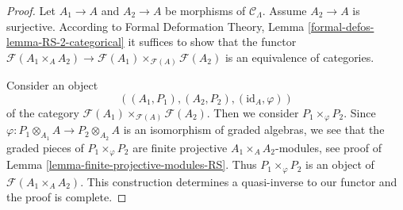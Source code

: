 \documentclass[10pt,a4paper]{amsart}
\theoremstyle{plain}
\theoremstyle{definition}
\theoremstyle{remark}
\numberwithin{equation}{subsection}
\begin{document}
\begin{proof}
Let $A_1 \to A$ and $A_2 \to A$ be morphisms of $\mathcal{C}_\Lambda$.
Assume $A_2 \to A$ is surjective. According to
Formal Deformation Theory, Lemma
\ref{formal-defos-lemma-RS-2-categorical}
it suffices to show that the functor
$\mathcal{F}(A_1 \times_A A_2) \to
\mathcal{F}(A_1) \times_{\mathcal{F}(A)} \mathcal{F}(A_2)$
is an equivalence of categories.

\medskip\noindent
Consider an object
$$
((A_1, P_1), (A_2, P_2), (\text{id}_A, \varphi))
$$
of the category $\mathcal{F}(A_1) \times_{\mathcal{F}(A)} \mathcal{F}(A_2)$.
Then we consider $P_1 \times_\varphi P_2$. Since
$\varphi : P_1 \otimes_{A_1} A \to P_2 \otimes_{A_2} A$
is an isomorphism of graded algebras, we see that the graded pieces
of $P_1 \times_\varphi P_2$ are finite projective $A_1 \times_A A_2$-modules,
see proof of Lemma \ref{lemma-finite-projective-modules-RS}.
Thus $P_1 \times_\varphi P_2$ is an object of $\mathcal{F}(A_1 \times_A A_2)$.
This construction determines a quasi-inverse to our functor
and the proof is complete.
\end{proof}
\end{document}
